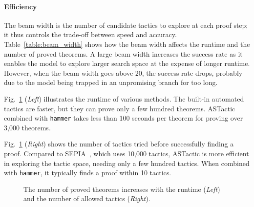 \documentclass{article}
\newcommand{\smallsec}[1]{\vspace{-3mm} \paragraph{#1}}
\begin{document}
\begin{table}[ht]
\vspace{-4mm}
\caption{The effect of the beam width on the success rate and the average runtime for proving a theorem.}
\vspace{-2mm}
\vspace{-2mm}
\label{table:beam_width}
\begin{center}
\begin{small}
\end{small}
\end{center}
\vskip -0.1in
\end{table}



\smallsec{Efficiency}
The beam width is the number of candidate tactics to explore at each proof step; it thus controls the trade-off between speed and accuracy.
Table~\ref{table:beam_width} shows how the beam width affects the runtime and the number of proved theorems.
A large beam width increases the success rate as it enables the model to explore larger search space at the expense of longer runtime. However, when the beam width goes above 20, the success rate drops, probably due to the model being trapped in an unpromising branch for too long.

Fig.~\ref{fig:runtime} (\textit{Left}) illustrates the runtime of various methods. The built-in automated tactics are faster, but they can prove only a few hundred theorems. ASTactic combined with \texttt{hammer} takes less than 100 seconds per theorem for proving over 3,000 theorems.



Fig.~\ref{fig:runtime} (\textit{Right}) shows the number of tactics tried before successfully finding a proof.
Compared to SEPIA~\citep{gransden2015sepia}, which uses 10,000 tactics, 
ASTactic is more efficient in exploring the tactic space, needing only a few hundred tactics. When combined with \texttt{hammer}, it typically finds a proof within 10 tactics. 



\begin{figure}[ht]
    \vspace{-5mm}
    \centering
    \vspace{-2mm}
    \caption{The number of proved theorems increases with the runtime (\textit{Left}) and the number of allowed tactics (\textit{Right}).}
    \label{fig:runtime}
\end{figure}
\end{document}
